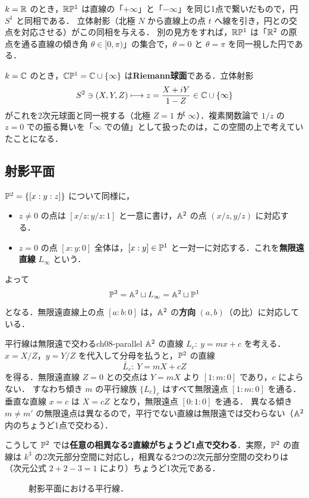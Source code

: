 $k=\mathbb{R}$ のとき，$\mathbb{R}\mathbb{P}^1$ は直線の「$+\infty$」と「$-\infty$」を同じ1点で繋いだもので，円 $S^1$ と同相である．
立体射影（北極 $N$ から直線上の点 $t$ へ線を引き，円との交点を対応させる）がこの同相を与える．
別の見方をすれば，$\mathbb{R}\mathbb{P}^1$ は「$\mathbb{R}^2$ の原点を通る直線の傾き角 $\theta\in[0,\pi)$」の集合で，$\theta=0$ と $\theta=\pi$ を同一視した円である．

$k=\mathbb{C}$ のとき，$\mathbb{C}\mathbb{P}^1=\mathbb{C}\cup\{\infty\}$ は\textbf{Riemann球面}である．立体射影
\[
  S^2\ni(X,Y,Z)\longmapsto z=\frac{X+iY}{1-Z}\in\mathbb{C}\cup\{\infty\}
\]
がこれを2次元球面と同一視する（北極 $Z=1$ が $\infty$）．複素関数論で $1/z$ の $z=0$ での振る舞いを「$\infty$ での値」として扱ったのは，この空間の上で考えていたことになる．

\subsection{射影平面}

$\mathbb{P}^2=\{[x:y:z]\}$ について同様に，
\begin{itemize}
  \item $z\ne0$ の点は $[x/z:y/z:1]$ と一意に書け，$\mathbb{A}^2$ の点 $(x/z,y/z)$ に対応する．
  \item $z=0$ の点 $[x:y:0]$ 全体は，$[x:y]\in\mathbb{P}^1$ と一対一に対応する．これを\textbf{無限遠直線} $L_\infty$ という．
\end{itemize}
よって
\[
  \mathbb{P}^2=\mathbb{A}^2\sqcup L_\infty=\mathbb{A}^2\sqcup\mathbb{P}^1
\]
となる．無限遠直線上の点 $[a:b:0]$ は，$\mathbb{A}^2$ の\textbf{方向} $(a,b)$（の比）に対応している．

\begin{myex}{平行線は無限遠で交わる}{ch08-parallel}
$\mathbb{A}^2$ の直線 $L_c:\ y=mx+c$ を考える．$x=X/Z$，$y=Y/Z$ を代入して分母を払うと，$\mathbb{P}^2$ の直線
\[
  \bar L_c:\ Y=mX+cZ
\]
を得る．無限遠直線 $Z=0$ との交点は $Y=mX$ より $[1:m:0]$ であり，$c$ によらない．
すなわち傾き $m$ の平行線族 $\{L_c\}_c$ はすべて無限遠点 $[1:m:0]$ を通る．
垂直な直線 $x=c$ は $X=cZ$ となり，無限遠点 $[0:1:0]$ を通る．
異なる傾き $m\ne m'$ の無限遠点は異なるので，平行でない直線は無限遠では交わらない（$\mathbb{A}^2$ 内のちょうど1点で交わる）．

こうして $\mathbb{P}^2$ では\textbf{任意の相異なる2直線がちょうど1点で交わる}．実際，$\mathbb{P}^2$ の直線は $k^3$ の2次元部分空間に対応し，相異なる2つの2次元部分空間の交わりは（次元公式 $2+2-3=1$ により）ちょうど1次元である．
\end{myex}

\begin{figure}[H]
\centering
{}
\caption{射影平面における平行線．}
\end{figure}

